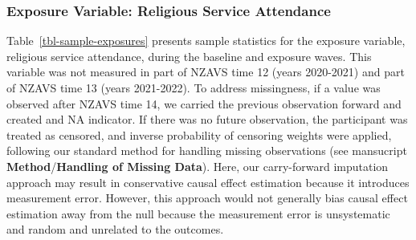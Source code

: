 \documentclass[
  single column]{article}
\begin{document}
\endgroup{}
\endgroup{}

\subsubsection{Exposure Variable: Religious Service
Attendance}\label{appendix-exposure}

Table~\ref{tbl-sample-exposures} presents sample statistics for the
exposure variable, religious service attendance, during the baseline and
exposure waves. This variable was not measured in part of NZAVS time 12
(years 2020-2021) and part of NZAVS time 13 (years 2021-2022). To
address missingness, if a value was observed after NZAVS time 14, we
carried the previous observation forward and created and NA indicator.
If there was no future observation, the participant was treated as
censored, and inverse probability of censoring weights were applied,
following our standard method for handling missing observations (see
mansucript \textbf{Method}/\textbf{Handling of Missing Data}). Here, our
carry-forward imputation approach may result in conservative causal
effect estimation because it introduces measurement error. However, this
approach would not generally bias causal effect estimation away from the
null because the measurement error is unsystematic and random and
unrelated to the outcomes.

\begingroup\fontsize{12}{14}\selectfont
\begingroup\fontsize{8}{10}\selectfont
\end{document}
